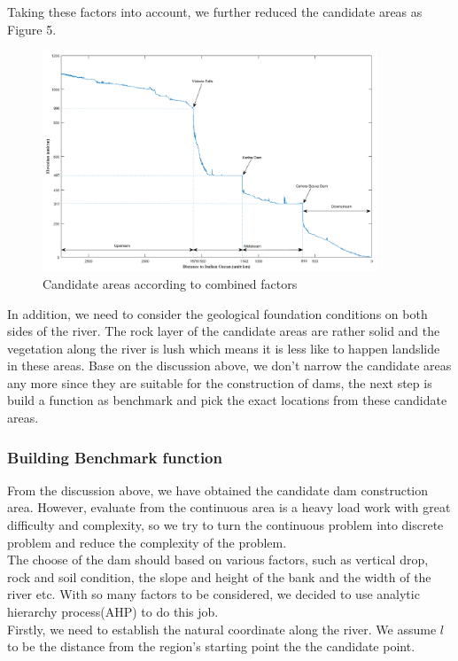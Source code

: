 \documentclass{mcmthesis}
\begin{document}
\indent Taking these factors into account, we further reduced the candidate areas as Figure 5.
\begin{figure}[h]
\small
\centering
\includegraphics[width=10cm]{./figures/dis_alti_v3.png}
\caption{Candidate areas according to combined factors} \label{fig:Fig4}
\end{figure}
\indent In addition, we need to consider the geological foundation conditions on both sides of the river. The rock layer of the candidate areas are rather solid and the vegetation along the river is lush which means it is less like to happen landslide in these areas. Base on the discussion above, we don't narrow the candidate areas any more since they are suitable for the construction of dams, the next step is build a function as benchmark and pick the exact locations from these candidate areas.

\subsubsection{Building Benchmark function}
\indent \indent From the discussion above, we have obtained the candidate dam construction area. However, evaluate from the continuous area is a heavy load work with great difficulty and complexity, so we try to turn the continuous problem into discrete problem and reduce the complexity of the problem.\\
\indent The choose of the dam should based on various factors, such as vertical drop, rock and soil condition, the slope and height of the bank and the width of the river etc. With so many factors to be considered, we decided to use analytic hierarchy process(AHP) to do this job.\\
\indent Firstly, we need to establish the natural coordinate along the river. We assume $l$ to be the distance from the region's starting point the the candidate point.
\end{document}
